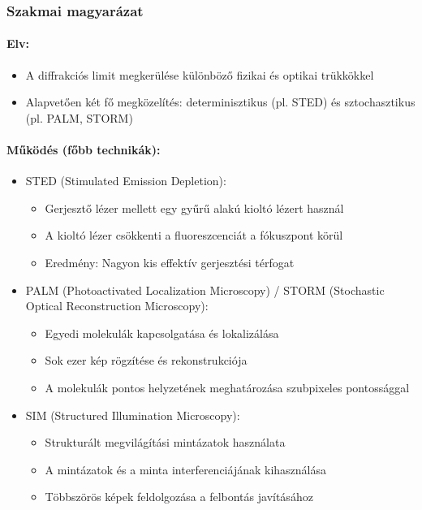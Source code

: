 \documentclass[a4paper,12pt]{article}
\begin{document}
\subsubsection{Szakmai magyarázat}

\paragraph{Elv:} \begin{itemize} \item A diffrakciós limit megkerülése különböző fizikai és optikai trükkökkel \item Alapvetően két fő megközelítés: determinisztikus (pl. STED) és sztochasztikus (pl. PALM, STORM) \end{itemize}

\paragraph{Működés (főbb technikák):} \begin{itemize} \item STED (Stimulated Emission Depletion): \begin{itemize} \item Gerjesztő lézer mellett egy gyűrű alakú kioltó lézert használ \item A kioltó lézer csökkenti a fluoreszcenciát a fókuszpont körül \item Eredmény: Nagyon kis effektív gerjesztési térfogat \end{itemize} \item PALM (Photoactivated Localization Microscopy) / STORM (Stochastic Optical Reconstruction Microscopy): \begin{itemize} \item Egyedi molekulák kapcsolgatása és lokalizálása \item Sok ezer kép rögzítése és rekonstrukciója \item A molekulák pontos helyzetének meghatározása szubpixeles pontossággal \end{itemize} \item SIM (Structured Illumination Microscopy): \begin{itemize} \item Strukturált megvilágítási mintázatok használata \item A mintázatok és a minta interferenciájának kihasználása \item Többszörös képek feldolgozása a felbontás javításához \end{itemize} \end{itemize}
\end{document}
